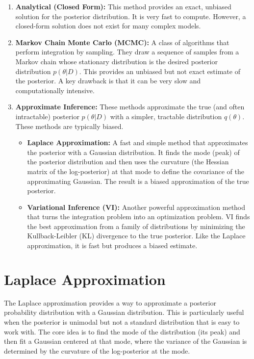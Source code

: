 \documentclass{article}
\begin{document}
\begin{multicols}{2}
	\begin{enumerate}
		\item \textbf{Analytical (Closed Form):} This method provides an exact, unbiased solution for the posterior distribution. It is very fast to compute. However, a closed-form solution does not exist for many complex models.

		\item \textbf{Markov Chain Monte Carlo (MCMC):} A class of algorithms that perform integration by sampling. They draw a sequence of samples from a Markov chain whose stationary distribution is the desired posterior distribution $p(\theta|D)$. This provides an unbiased but not exact estimate of the posterior. A key drawback is that it can be very slow and computationally intensive.

		\item \textbf{Approximate Inference:} These methods approximate the true (and often intractable) posterior $p(\theta|D)$ with a simpler, tractable distribution $q(\theta)$. These methods are typically biased.
		      \begin{itemize}
			      \item \textbf{Laplace Approximation:} A fast and simple method that approximates the posterior with a Gaussian distribution. It finds the mode (peak) of the posterior distribution and then uses the curvature (the Hessian matrix of the log-posterior) at that mode to define the covariance of the approximating Gaussian. The result is a biased approximation of the true posterior.

			      \item \textbf{Variational Inference (VI):} Another powerful approximation method that turns the integration problem into an optimization problem. VI finds the best approximation from a family of distributions by minimizing the Kullback-Leibler (KL) divergence to the true posterior. Like the Laplace approximation, it is fast but produces a biased estimate.
		      \end{itemize}
	\end{enumerate}


	\section{Laplace Approximation}

	The Laplace approximation provides a way to approximate a posterior probability distribution with a Gaussian distribution. This is particularly useful when the posterior is unimodal but not a standard distribution that is easy to work with. The core idea is to find the mode of the distribution (its peak) and then fit a Gaussian centered at that mode, where the variance of the Gaussian is determined by the curvature of the log-posterior at the mode.


\end{multicols}
\end{document}
